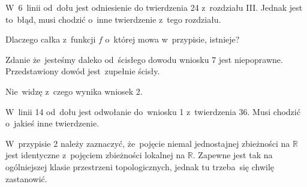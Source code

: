 \documentclass[a4paper,11pt]{article}
\begin{document}
\vspace{\spaceFour}


\start {} W~6~linii od~dołu jest odniesienie do twierdzenia 24
z~rozdziału III. Jednak jest to~błąd, musi chodzić o~inne twierdzenie
z~tego rozdziału.

\vspace{\spaceFour}


\start {} Dlaczego całka z~funkcji $f$ o~której mowa
w~przypisie, istnieje?

\vspace{\spaceFour}


\start {} Zdanie że~jesteśmy daleko od~ścisłego dowodu wniosku
7 jest niepoprawne. Przedstawiony dowód jest~zupełnie ścisły.

\vspace{\spaceFour}


\start {} Nie~widzę z~czego wynika wniosek 2.

\vspace{\spaceFour}


\start {} W~linii 14 od~dołu jest odwołanie do~wniosku 1
z~twierdzenia 36. Musi chodzić o~jakieś inne twierdzenie.

\vspace{\spaceFour}


\start {} W~przypisie 2 należy zaznaczyć, że~pojęcie niemal
jednostajnej zbieżności na $\mathbb{R}$ jest identyczne z~pojęciem
zbieżności lokalnej na $\mathbb{R}$. Zapewne jest tak na ogólniejszej
klasie przestrzeni topologicznych, jednak tu trzeba~się chwilę
zastanowić. %

\newpage
\end{document}
